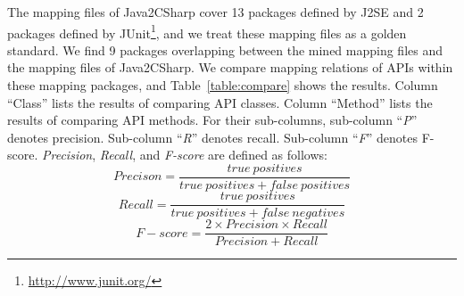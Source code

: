The mapping files of Java2CSharp cover 13 packages defined by J2SE
and 2 packages defined by
JUnit\footnote{\url{http://www.junit.org/}}, and we treat these
mapping files as a golden standard. We find 9 packages overlapping
between the mined mapping files and the mapping files of
Java2CSharp. We compare mapping relations of APIs within these
mapping packages, and Table~\ref{table:compare} shows the results.
Column ``Class'' lists the results of comparing API classes. Column
``Method'' lists the results of comparing API methods. For their
sub-columns, sub-column ``\emph{P}'' denotes precision. Sub-column
``\emph{R}'' denotes recall. Sub-column ``\emph{F}'' denotes
F-score. \emph{Precision}, \emph{Recall}, and \emph{F-score} are
defined as follows:\vspace*{-2ex}
\begin{equation}\label{eq-precison}
Precison=\frac{true\ positives}{true\ positives+false\ positives}
\end{equation}\vspace*{-2ex}
\begin{equation}\label{eq-recall}
Recall=\frac{true\ positives}{true\ positives+false\ negatives}
\end{equation}\vspace*{-2ex}
\begin{equation}\label{eq-fscore}
F\!-\!score=\frac{2\times Precision \times Recall}{Precision+Recall}
\end{equation}\vspace*{-2ex}

